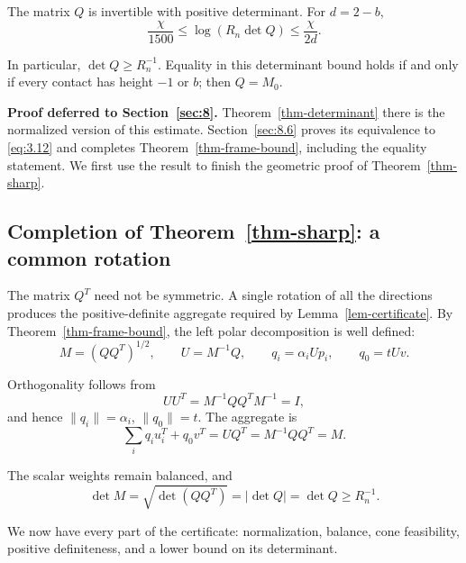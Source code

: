 \begin{theorem}\label{thm-frame-bound}
The matrix $Q$ is invertible with positive determinant. For $d=2-b$,
\begin{equation}\label{eq:3.12}
\frac{\chi}{1500}\le\log(R_n\det Q)\le\frac{\chi}{2d}.
\end{equation}

In particular, $\det Q\ge R_n^{-1}$. Equality in this determinant bound holds if and only if every contact has height $-1$ or $b$; then $Q=M_0$.

\end{theorem}

\textbf{Proof deferred to Section~\ref{sec:8}.} Theorem~\ref{thm-determinant} there is the normalized version
of this estimate. Section~\ref{sec:8.6} proves its equivalence to \eqref{eq:3.12} and completes
Theorem~\ref{thm-frame-bound}, including the equality statement. We first use the result to
finish the geometric proof of Theorem~\ref{thm-sharp}.

\subsection{Completion of Theorem~\ref{thm-sharp}: a common rotation}\label{sec:3.4}

The matrix $Q^T$ need not be symmetric. A single rotation of all the directions produces the positive-definite aggregate required by Lemma~\ref{lem-certificate}. By Theorem~\ref{thm-frame-bound}, the left polar decomposition is well defined:
\begin{equation}\label{eq:3.13}
M=(QQ^T)^{1/2},\qquad U=M^{-1}Q,
\qquad q_i=\alpha_iUp_i,\qquad q_0=tUv.
\end{equation}

Orthogonality follows from
\begin{equation}\label{eq:3.14}
UU^T=M^{-1}QQ^TM^{-1}=I,
\end{equation}
and hence $\|q_i\|=\alpha_i$, $\|q_0\|=t$. The aggregate is
\begin{equation}\label{eq:3.15}
\sum_iq_iu_i^T+q_0v^T=UQ^T=M^{-1}QQ^T=M.
\end{equation}

The scalar weights remain balanced, and
\begin{equation}\label{eq:3.16}
\det M=\sqrt{\det(QQ^T)}=|\det Q|=\det Q\ge R_n^{-1}.
\end{equation}

We now have every part of the certificate: normalization, balance, cone feasibility, positive definiteness, and a lower bound on its determinant.

